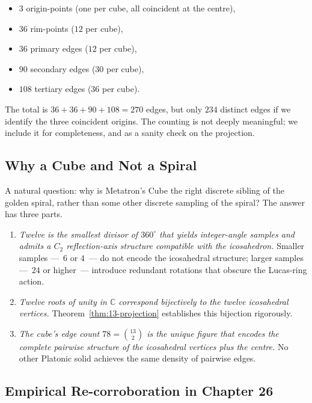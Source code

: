 \begin{itemize}
\item $3$ origin-points (one per cube, all coincident at the centre),
\item $36$ rim-points ($12$ per cube),
\item $36$ primary edges ($12$ per cube),
\item $90$ secondary edges ($30$ per cube),
\item $108$ tertiary edges ($36$ per cube).
\end{itemize}

The total is $36 + 36 + 90 + 108 = 270$ edges, but only $234$
distinct edges if we identify the three coincident origins. The
counting is not deeply meaningful; we include it for
completeness, and as a sanity check on the projection.

\subsection{Why a Cube and Not a Spiral}
\label{sec:13-cube-vs-spiral}

A natural question: why is Metatron's Cube the right discrete
sibling of the golden spiral, rather than some other discrete
sampling of the spiral? The answer has three parts.

\begin{enumerate}
\item \emph{Twelve is the smallest divisor of $360^{\circ}$ that
  yields integer-angle samples and admits a $C_{2}$
  reflection-axis structure compatible with the icosahedron.}
  Smaller samples ---~$6$ or $4$~--- do not encode the icosahedral
  structure; larger samples ---~$24$ or higher~--- introduce
  redundant rotations that obscure the Lucas-ring action.
\item \emph{Twelve roots of unity in $\mathbb{C}$ correspond
  bijectively to the twelve icosahedral vertices.}
  Theorem~\ref{thm:13-projection} establishes this bijection
  rigorously.
\item \emph{The cube's edge count $78 = \binom{13}{2}$ is the
  unique figure that encodes the complete pairwise structure of
  the icosahedral vertices plus the centre.} No other Platonic
  solid achieves the same density of pairwise edges.
\end{enumerate}

\subsection{Empirical Re-corroboration in Chapter 26}
\label{sec:13-emp-26}

